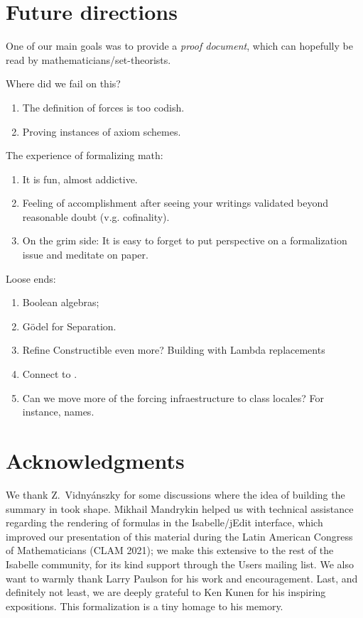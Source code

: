 \section{Future directions}
\label{sec:conclusion}

One of our main goals was to provide a \emph{proof document}, which
can hopefully be read by mathematicians/set-theorists.

Where did we fail on this?
\begin{enumerate}
\item
  The definition of forces is too codish.
\item
  Proving instances of axiom schemes.
\end{enumerate}

The experience of formalizing math:
\begin{enumerate}
\item It is fun, almost addictive.
\item Feeling of accomplishment after seeing your writings
  validated beyond reasonable doubt (v.g. cofinality).
\item On the grim side: It is easy to forget to put perspective on a
  formalization issue and meditate on paper.
\end{enumerate}

Loose ends:
\begin{enumerate}
\item
  Boolean algebras;
\item
  Gödel for Separation.
\item
  Refine Constructible even more? Building with Lambda replacements
\item
  Connect to  \cite{2022arXiv220503159P}.
\item
  Can we move more of the forcing infraestructure to class locales?
  For instance, names.
\end{enumerate}

\section*{Acknowledgments}
\label{sec:acknowledgments}
We thank Z.~Vidnyánszky for some discussions where the idea of
building the summary in  took shape.
Mikhail Mandrykin helped us with technical assistance regarding the
rendering of formulas in the Isabelle/jEdit interface, which improved
our presentation of this material during the Latin American Congress
of Mathematicians (CLAM 2021); we make this extensive to the rest of
the Isabelle community, for its kind support through the Users mailing
list. We also want to warmly thank Larry Paulson for his work and
encouragement.  Last, and definitely not least, we are deeply grateful
to Ken Kunen for his
inspiring expositions. This formalization is a tiny homage to his
memory.


